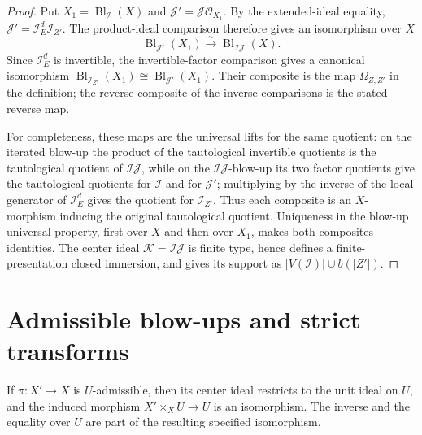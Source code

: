 \begin{proof}
  \leanok
  Put $X_1=\operatorname{Bl}_{\mathcal I}(X)$ and
  $\mathcal J'=\mathcal J\mathcal O_{X_1}$.  By the extended-ideal equality,
  $\mathcal J'=\mathcal I_E^d\mathcal I_{Z'}$.  The product-ideal comparison
   therefore gives an isomorphism over
  $X$
  \[
    \operatorname{Bl}_{\mathcal J'}(X_1)
      \xrightarrow{\sim}\operatorname{Bl}_{\mathcal I\mathcal J}(X).
  \]
  Since $\mathcal I_E^d$ is invertible, the invertible-factor comparison
   gives a canonical isomorphism
  $\operatorname{Bl}_{\mathcal I_{Z'}}(X_1)\cong
    \operatorname{Bl}_{\mathcal J'}(X_1)$.  Their composite is the map
  $\Omega_{Z,Z'}$ in the definition; the reverse composite of the inverse
  comparisons is the stated reverse map.

  For completeness, these maps are the universal lifts for the same quotient:
  on the iterated blow-up the product of the tautological invertible quotients
  is the tautological quotient of $\mathcal I\mathcal J$, while on the
  $\mathcal I\mathcal J$-blow-up its two factor quotients give the tautological
  quotients for $\mathcal I$ and for $\mathcal J'$; multiplying by the inverse
  of the local generator of $\mathcal I_E^d$ gives the quotient for
  $\mathcal I_{Z'}$.  Thus each composite is an $X$-morphism inducing the
  original tautological quotient.  Uniqueness in the blow-up universal
  property, first over $X$ and then over $X_1$, makes both composites identities.
  The center ideal $\mathcal K=\mathcal I\mathcal J$ is finite type, hence
  defines a finite-presentation closed immersion, and
   gives its support as
  $|V(\mathcal I)|\cup b(|Z'|)$.
\end{proof}


\section{Admissible blow-ups and strict transforms}

\begin{lemma}
  \label{lemma:nagata-admissible-blowup-over-open}
  \leanok

  If $\pi\colon X'\to X$ is $U$-admissible, then its center ideal restricts to
  the unit ideal on $U$, and the induced morphism
  $X'\times_XU\to U$ is an isomorphism.  The inverse and the equality over
  $U$ are part of the resulting specified isomorphism.
\end{lemma}

